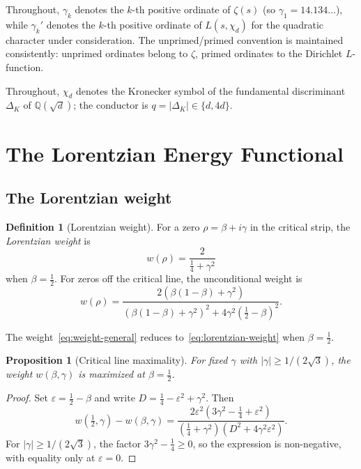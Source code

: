 \documentclass[12pt,reqno]{amsart}
\theoremstyle{plain}
\newtheorem{proposition}[theorem]{Proposition}
\theoremstyle{definition}
\newtheorem{definition}[theorem]{Definition}
\theoremstyle{remark}
\newcommand{\Q}{\mathbb{Q}}
\newcommand{\half}{\tfrac{1}{2}}
\newcommand{\quarter}{\tfrac{1}{4}}
\begin{document}
Throughout, $\gamma_k$ denotes the $k$-th positive ordinate of $\zeta(s)$ (so $\gamma_1 = 14.134\ldots$), while $\gamma_k'$ denotes the $k$-th positive ordinate of $L(s, \chi_d)$ for the quadratic character under consideration. The unprimed/primed convention is maintained consistently: unprimed ordinates belong to $\zeta$, primed ordinates to the Dirichlet $L$-function.

Throughout, $\chi_d$ denotes the Kronecker symbol of the fundamental discriminant $\Delta_K$ of $\Q(\sqrt{d})$; the conductor is $q = |\Delta_K| \in \{d, 4d\}$.

\section{The Lorentzian Energy Functional}\label{sec:lorentzian}

\subsection{The Lorentzian weight}

\begin{definition}[Lorentzian weight]\label{def:lorentzian}
For a zero $\rho = \beta + i\gamma$ in the critical strip, the \emph{Lorentzian weight} is
\[
w(\rho) = \frac{2}{\quarter + \gamma^2}
\]
when $\beta = \half$. For zeros off the critical line, the unconditional weight is
\begin{equation}\label{eq:weight-general}
w(\rho) = \frac{2(\beta(1-\beta)+\gamma^2)}{(\beta(1-\beta)+\gamma^2)^2 + 4\gamma^2(\half-\beta)^2}.
\end{equation}
\end{definition}

The weight~\eqref{eq:weight-general} reduces to~\eqref{eq:lorentzian-weight} when $\beta = \half$.

\begin{proposition}[Critical line maximality]\label{prop:CLM}
For fixed $\gamma$ with $|\gamma| \geq 1/(2\sqrt{3})$, the weight $w(\beta,\gamma)$ is maximized at $\beta = \half$.
\end{proposition}

\begin{proof}
Set $\varepsilon = \half - \beta$ and write $D = \quarter - \varepsilon^2 + \gamma^2$. Then
\[
w(\half,\gamma) - w(\beta,\gamma)
= \frac{2\varepsilon^2(3\gamma^2 - \quarter + \varepsilon^2)}{(\quarter+\gamma^2)(D^2 + 4\gamma^2\varepsilon^2)}.
\]
For $|\gamma| \geq 1/(2\sqrt{3})$, the factor $3\gamma^2 - \quarter \geq 0$, so the expression is non-negative, with equality only at $\varepsilon = 0$.
\end{proof}
\end{document}
